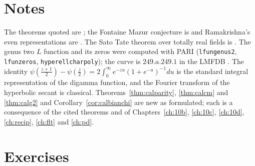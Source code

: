 \section{Notes}

The theorems quoted are \cite{calegari2011,calegari2012,calegarigeraghty2018,accghlnstt2023,bcgp2021,calegarivenkatesh2019,bergeronvenkatesh2013}; the Fontaine Mazur conjecture is \cite{fontainemazur1995} and Ramakrishna's even representations are \cite{ramakrishna2002}. The Sato Tate theorem over totally real fields is \cite{blght2011}. The genus two $L$ function and its zeros were computed with PARI \cite{pari2023} (\texttt{lfungenus2}, \texttt{lfunzeros}, \texttt{hyperellcharpoly}); the curve is $249.a.249.1$ in the LMFDB \cite{lmfdb}. The identity $\psi(\frac{z+1}2)-\psi(\frac z2)=2\int_0^\infty e^{-zu}(1+e^{-u})^{-1}du$ is the standard integral representation of the digamma function, and the Fourier transform of the hyperbolic secant is classical. Theorems~\ref{thm:calparity}, \ref{thm:calcm} and \ref{thm:calg2} and Corollary~\ref{cor:calbianchi} are new as formulated; each is a consequence of the cited theorems and of Chapters~\ref{ch:10b}, \ref{ch:10c}, \ref{ch:10d}, \ref{ch:recip}, \ref{ch:flt} and \ref{ch:pd}.

\section{Exercises}

